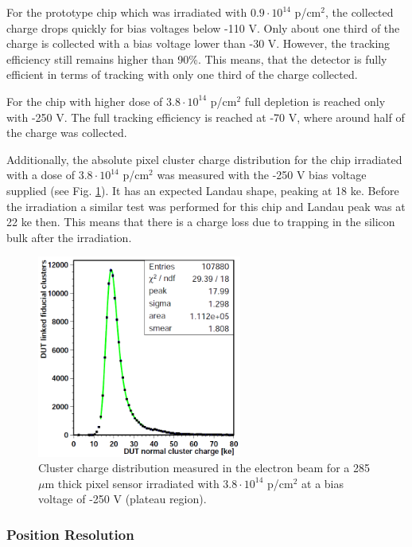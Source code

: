 For the prototype chip which was irradiated with $0.9 \cdot 10^{14}$ p/cm$^2$, the collected charge drops quickly for bias voltages below -110 V. 
Only about one third of the charge is collected with a bias voltage lower than -30 V. However, the tracking efficiency still remains higher
than 90\%. This means, that the detector is fully efficient in terms of tracking with only one third of the charge collected.

For the chip with higher dose of $3.8 \cdot 10^{14}$ p/cm$^2$ full depletion is reached only with -250 V. The full tracking efficiency
is reached at -70 V, where around half of the charge was collected.

Additionally, the absolute pixel cluster charge distribution for the chip irradiated with a dose of $3.8 \cdot 10^{14}$ p/cm$^2$ was measured
with the -250 V bias voltage supplied (see Fig. \ref{fig:Landau}). It has an expected Landau shape, peaking at 18 ke. Before the irradiation a 
similar test was performed for this chip and Landau peak was at 22 ke then. This means that there is a charge loss due to trapping in the silicon
bulk after the irradiation.

\begin{figure}[t]
 \centering
 \includegraphics[width=0.6\textwidth]{021_pixel_upgrade/plots/Landau.png}
 \caption{Cluster charge distribution measured in the electron beam for a 285 $\mu$m thick pixel sensor irradiated with $3.8 \cdot 10^{14}$ p/cm$^2$ 
 at a bias voltage of -250 V (plateau region).}
 \label{fig:Landau}
\end{figure}

\subsubsection{Position Resolution}

